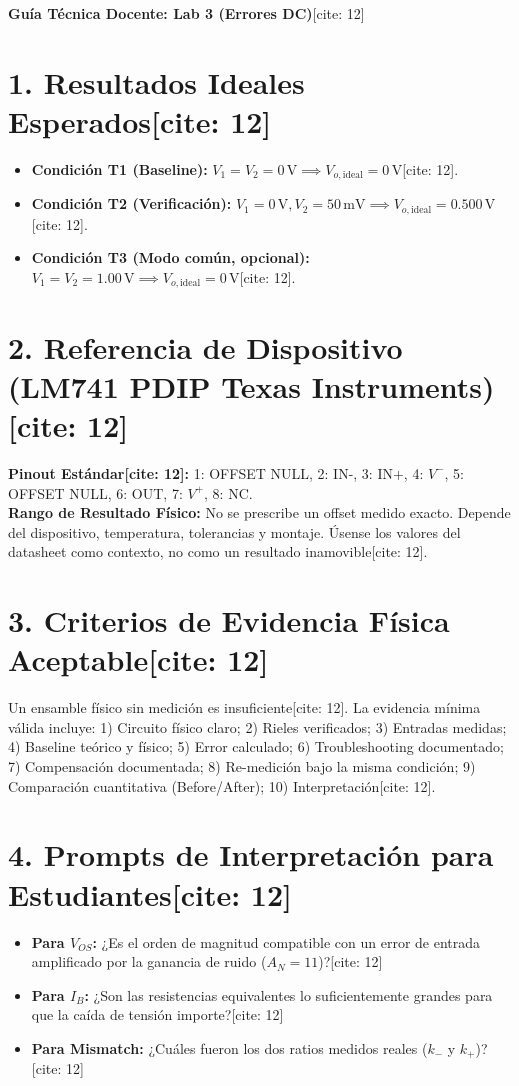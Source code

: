 \documentclass[11pt, a4paper]{article}
\begin{document}
\begin{center}
    \Large\textbf{\textcolor{ucbblue}{Guía Técnica Docente: Lab 3 (Errores DC)}}[cite: 12]
\end{center}

\section*{1. Resultados Ideales Esperados[cite: 12]}
\begin{itemize}
    \item \textbf{Condición T1 (Baseline):} $V_1=V_2=0\,\text{V} \implies V_{o,\mathrm{ideal}} = 0\,\text{V}$[cite: 12].
    \item \textbf{Condición T2 (Verificación):} $V_1=0\,\text{V}, V_2=50\,\text{mV} \implies V_{o,\mathrm{ideal}} = 0.500\,\text{V}$[cite: 12].
    \item \textbf{Condición T3 (Modo común, opcional):} $V_1=V_2=1.00\,\text{V} \implies V_{o,\mathrm{ideal}} = 0\,\text{V}$[cite: 12].
\end{itemize}

\section*{2. Referencia de Dispositivo (LM741 PDIP Texas Instruments)[cite: 12]}
\textbf{Pinout Estándar[cite: 12]:}
1: OFFSET NULL, 2: IN-, 3: IN+, 4: $V^-$, 5: OFFSET NULL, 6: OUT, 7: $V^+$, 8: NC. \\
\textbf{Rango de Resultado Físico:} No se prescribe un offset medido exacto. Depende del dispositivo, temperatura, tolerancias y montaje. Úsense los valores del datasheet como contexto, no como un resultado inamovible[cite: 12].

\section*{3. Criterios de Evidencia Física Aceptable[cite: 12]}
Un ensamble físico sin medición es insuficiente[cite: 12]. La evidencia mínima válida incluye:
1) Circuito físico claro; 2) Rieles verificados; 3) Entradas medidas; 4) Baseline teórico y físico; 5) Error calculado; 6) Troubleshooting documentado; 7) Compensación documentada; 8) Re-medición bajo la misma condición; 9) Comparación cuantitativa (Before/After); 10) Interpretación[cite: 12].

\section*{4. Prompts de Interpretación para Estudiantes[cite: 12]}
\begin{itemize}
    \item \textbf{Para $V_{OS}$:} ¿Es el orden de magnitud compatible con un error de entrada amplificado por la ganancia de ruido ($A_N=11$)?[cite: 12]
    \item \textbf{Para $I_B$:} ¿Son las resistencias equivalentes lo suficientemente grandes para que la caída de tensión importe?[cite: 12]
    \item \textbf{Para Mismatch:} ¿Cuáles fueron los dos ratios medidos reales ($k_-$ y $k_+$)?[cite: 12]
\end{itemize}
\end{document}
